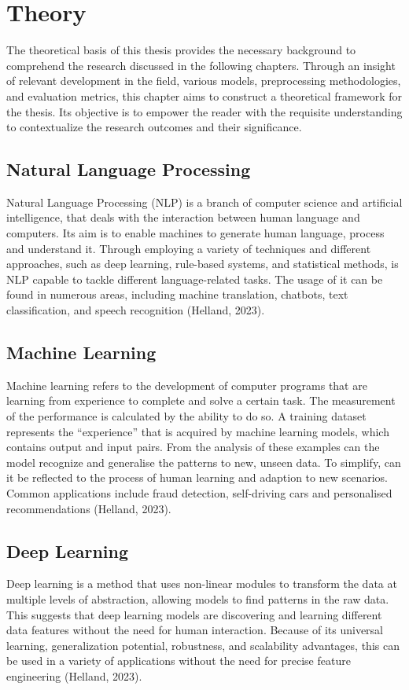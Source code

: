 \chapter{Theory}

The theoretical basis of this thesis provides the necessary background to comprehend the research discussed in the following chapters. Through an insight of relevant development in the field, various models, preprocessing methodologies, and evaluation metrics, this chapter aims to construct a theoretical framework for the thesis. Its objective is to empower the reader with the requisite understanding to contextualize the research outcomes and their significance.

\section{Natural Language Processing}

Natural Language Processing (NLP) is a branch of computer science and artificial intelligence, that deals with the interaction between human language and computers. Its aim is to enable machines to generate human language, process and understand it. Through employing a variety of techniques and different approaches, such as deep learning, rule-based systems, and statistical methods, is NLP capable to tackle different language-related tasks. The usage of it can be found in numerous areas, including machine translation, chatbots, text classification, and speech recognition (Helland, 2023).

\section{Machine Learning}

Machine learning refers to the development of computer programs that are learning from experience to complete and solve a certain task. The measurement of the performance is calculated by the ability to do so. A training dataset represents the “experience” that is acquired by machine learning models, which contains output and input pairs. From the analysis of these examples can the model recognize and generalise the patterns to new, unseen data. To simplify, can it be reflected to the process of human learning and adaption to new scenarios. Common applications include fraud detection, self-driving cars and personalised recommendations (Helland, 2023).

\section{Deep Learning}

Deep learning is a method that uses non-linear modules to transform the data at multiple levels of abstraction, allowing models to find patterns in the raw data. This suggests that deep learning models are discovering and learning different data features without the need for human interaction. Because of its universal learning, generalization potential, robustness, and scalability advantages, this can be used in a variety of applications without the need for precise feature engineering (Helland, 2023).